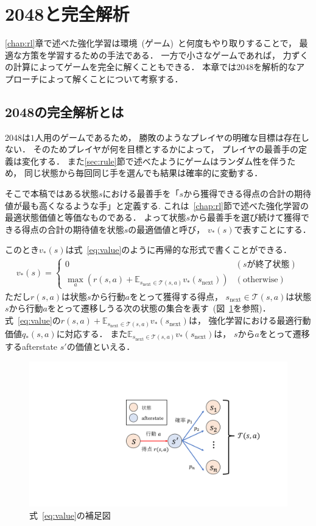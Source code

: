 \section{2048と完全解析}
\label{chap:solving}
\ref{chap:rl}章で述べた強化学習は環境~(ゲーム)~と何度もやり取りすることで， 最適な方策を学習するための手法である．
一方で小さなゲームであれば， 力ずくの計算によってゲームを完全に解くこともできる．
本章では2048を解析的なアプローチによって解くことについて考察する．

\subsection{2048の完全解析とは}
\label{sec:solving}
2048は$1$人用のゲームであるため， 勝敗のようなプレイヤの明確な目標は存在しない．
そのためプレイヤが何を目標とするかによって， プレイヤの最善手の定義は変化する．
また\ref{sec:rule}節で述べたようにゲームはランダム性を伴うため， 同じ状態から毎回同じ手を選んでも結果は確率的に変動する．

そこで本稿ではある状態$s$における最善手を「$s$から獲得できる得点の合計の期待値が最も高くなるような手」と定義する.
これは~\ref{chap:rl}節で述べた強化学習の最適状態価値と等価なものである．
よって状態$s$から最善手を選び続けて獲得できる得点の合計の期待値を状態$s$の最適価値と呼び， $v_*(s)$で表すことにする．

このとき$v_*(s)$は式~\ref{eq:value}のように再帰的な形式で書くことができる．
\begin{align}
    v_*(s) =
    \begin{cases}
        0 & (s \text{が終了状態}) \\
        \max_a \left(r(s,a) + \mathbb{E}_{s_\text{next} \in \mathcal{T}(s,a)} v_*(s_\text{next}) \right) & (\text{otherwise})
    \end{cases}
    \label{eq:value}
\end{align}
ただし$r(s,a)$は状態$s$から行動$a$をとって獲得する得点， $s_\text{next} \in \mathcal{T}(s,a)$は状態$s$から行動$a$をとって遷移しうる次の状態の集合を表す~(図~\ref{fig:state_afterstate}を参照)．
式~\ref{eq:value}の$r(s,a) + \mathbb{E}_{s_\text{next} \in \mathcal{T}(s,a)} v_*(s_\text{next})$は， 強化学習における最適行動価値$q_*(s,a)$に対応する．
また$\mathbb{E}_{s_\text{next} \in \mathcal{T}(s,a)} v_*(s_\text{next})$は， $s$から$a$をとって遷移するafterstate $s'$の価値といえる．

\begin{figure}[t]
    \centering
    \includegraphics[width=0.6\linewidth{}]{figures/value_function_.pdf}
    \caption{式~\ref{eq:value}の補足図}
    \label{fig:state_afterstate}
\end{figure}

